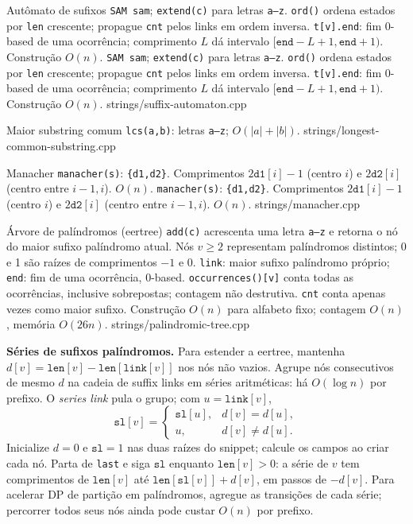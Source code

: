\templateentry
{Autômato de sufixos}
{\texttt{SAM sam}; \texttt{extend(c)} para letras \texttt{a--z}. \texttt{ord()} ordena estados por \texttt{len} crescente; propague \texttt{cnt} pelos links em ordem inversa. \texttt{t[v].end}: fim 0-based de uma ocorrência; comprimento $L$ dá intervalo $[\mathtt{end}-L+1,\mathtt{end}+1)$. Construção $O(n)$.}
{\texttt{SAM sam}; \texttt{extend(c)} para letras \texttt{a--z}. \texttt{ord()} ordena estados por \texttt{len} crescente; propague \texttt{cnt} pelos links em ordem inversa. \texttt{t[v].end}: fim 0-based de uma ocorrência; comprimento $L$ dá intervalo $[\mathtt{end}-L+1,\mathtt{end}+1)$. Construção $O(n)$.}
{strings/suffix-automaton.cpp}

\ifextended

\templateentry
{Maior substring comum}
{}
{\texttt{lcs(a,b)}: letras \texttt{a--z}; $O(|a|+|b|)$.}
{strings/longest-common-substring.cpp}

\fi

\templateentry
{Manacher}
{\texttt{manacher(s)}: \texttt{\{d1,d2\}}. Comprimentos $2\mathtt{d1}[i]-1$ (centro $i$) e $2\mathtt{d2}[i]$ (centro entre $i-1,i$). $O(n)$.}
{\texttt{manacher(s)}: \texttt{\{d1,d2\}}. Comprimentos $2\mathtt{d1}[i]-1$ (centro $i$) e $2\mathtt{d2}[i]$ (centro entre $i-1,i$). $O(n)$.}
{strings/manacher.cpp}

\ifextended
\templateentry
{Árvore de palíndromos (eertree)}
{}
{\texttt{add(c)} acrescenta uma letra \texttt{a--z} e retorna o nó do maior sufixo palíndromo atual. Nós $v\ge2$ representam palíndromos distintos; 0 e 1 são raízes de comprimentos $-1$ e 0. \texttt{link}: maior sufixo palíndromo próprio; \texttt{end}: fim de uma ocorrência, 0-based. \texttt{occurrences()[v]} conta todas as ocorrências, inclusive sobrepostas; contagem não destrutiva. \texttt{cnt} conta apenas vezes como maior sufixo. Construção $O(n)$ para alfabeto fixo; contagem $O(n)$, memória $O(26n)$.}
{strings/palindromic-tree.cpp}

\textbf{Séries de sufixos palíndromos.}
Para estender a eertree, mantenha $d[v]=\mathtt{len}[v]-\mathtt{len}[\mathtt{link}[v]]$ nos nós não vazios. Agrupe nós consecutivos de mesmo $d$ na cadeia de suffix links em séries aritméticas: há $O(\log n)$ por prefixo. O \emph{series link} pula o grupo; com $u=\mathtt{link}[v]$,
\[
\mathtt{sl}[v]=\begin{cases}\mathtt{sl}[u],&d[v]=d[u],\\u,&d[v]\ne d[u].\end{cases}
\]
Inicialize $d=0$ e $\mathtt{sl}=1$ nas duas raízes do snippet; calcule os campos ao criar cada nó. Parta de \texttt{last} e siga $\mathtt{sl}$ enquanto $\mathtt{len}[v]>0$: a série de $v$ tem comprimentos de $\mathtt{len}[v]$ até $\mathtt{len}[\mathtt{sl}[v]]+d[v]$, em passos de $-d[v]$. Para acelerar DP de partição em palíndromos, agregue as transições de cada série; percorrer todos seus nós ainda pode custar $O(n)$ por prefixo.
\fi

